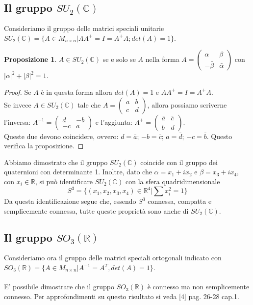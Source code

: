 \documentclass[12pt,a4paper]{report}
\theoremstyle{definition}
\newtheorem{Prop}[Def]{Proposizione}
\theoremstyle{definition}
\theoremstyle{definition}
\theoremstyle{definition}
\begin{document}
\subsection{Il gruppo $SU_2(\mathbb{C})$ }
Consideriamo il gruppo delle matrici speciali unitarie $SU_2(\mathbb{C})=\{A\in M_{n\times n}|AA^{+}=I=A^{+}A;det(A)=1\}$.
\begin{Prop}
	$A\in SU_2(\mathbb{C})$ se e solo se $A$ nella forma $A=
	\begin{pmatrix}
		\alpha & \beta \\
		-\bar{\beta} & \bar{\alpha}
	\end{pmatrix}
	$ con $|\alpha|^2+|\beta|^2=1$.
\end{Prop}
\begin{proof}
	Se $A$ è in questa forma allora $det(A)=1$ e $AA^{+}=I=A^{+}A$.\\
	Se invece $A\in SU_2(\mathbb{C})$ tale che $A=
	\begin{pmatrix}
		a & b \\
		c & d
	\end{pmatrix}$, allora possiamo scriverne l'inversa:
$A^{-1}=\begin{pmatrix}
	d & -b \\
	-c & a
\end{pmatrix}$ e l'aggiunta: $A^+=
\begin{pmatrix}
	\bar{a} & \bar{c} \\
	\bar{b} & \bar{d}
\end{pmatrix}$.\\
Queste due devono coincidere, ovvero: $d=\bar{a}$; $-b=\bar{c}$; $a=\bar{d}$; $-c=\bar{b}$. Questo verifica la proposizione.
\end{proof}
Abbiamo dimostrato che il gruppo $SU_2(\mathbb{C})$ coincide con il gruppo dei quaternioni con determinante 1.
Inoltre, dato che $\alpha=x_1+ix_2$ e $\beta=x_3+ix_4$, con $x_i\in\mathbb{R}$, si può identificare $SU_2(\mathbb{C})$ con la sfera quadridimensionale $$S^3=\{(x_1,x_2,x_3,x_4)\in \mathbb{R}^4|\sum x_i^2=1\}$$
Da questa identificazione segue che, essendo $S^3$ connessa, compatta e semplicemente connessa, tutte queste proprietà sono anche di $SU_2(\mathbb{C})$.
\subsection{Il gruppo $SO_3(\mathbb{R})$}
Consideriamo ora il gruppo delle matrici speciali ortogonali indicato con $SO_3(\mathbb{R})=\{A\in M_{n\times n}|A^{-1}=A^T, det(A)=1\}$.\\
\\
E' possibile dimostrare che il gruppo $SO_3(\mathbb{R})$ è connesso ma non semplicemente connesso. Per approfondimenti su questo risultato si veda [4] pag. 26-28 cap.1.
\end{document}

